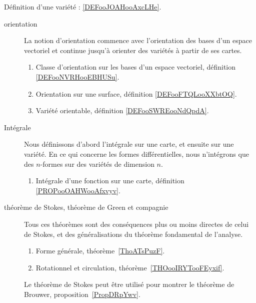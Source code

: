	\label{THEMEooIntegrationVarietes}
Définition d'une variété : \ref{DEFooJOAHooAxcLHe}.
\begin{description}
	\item[orientation]
		La notion d'orientation commence avec l'orientation des bases d'un espace vectoriel et continue jusqu'à orienter des variétés à partir de ses cartes.
		\begin{enumerate}
			\item
			      Classe d'orientation sur les bases d'un espace vectoriel, définition \ref{DEFooNVRHooEBHUSu}.
			\item
			      Orientation sur une surface, définition \ref{DEFooFTQLooXXbtOQ}.
			\item
			      Variété orientable, définition \ref{DEFooSWREooNdQpdA}.
		\end{enumerate}
	\item[Intégrale]
		Nous définissons d'abord l'intégrale sur une carte, et ensuite sur une variété. En ce qui concerne les formes différentielles, nous n'intégrons que des \( n\)-formes sur des variétés de dimension \( n\).
		\begin{enumerate}
			\item
			      Intégrale d'une fonction sur une carte, définition \ref{PROPooOAHWooAfxvyv}.
		\end{enumerate}
	\item[théorème de Stokes, théorème de Green et compagnie]
		Tous ces théorèmes sont des conséquences plus ou moins directes de celui de Stokes, et des généralisations du théorème fondamental de l'analyse.
		\begin{enumerate}
			\item
			      Forme générale, théorème~\ref{ThoATsPuzF}.
			\item
			      Rotationnel et circulation, théorème~\ref{THOooIRYTooFEyxif}.
		\end{enumerate}
		Le théorème de Stokes peut être utilisé pour montrer le théorème de Brouwer, proposition~\ref{PropDRpYwv}.
\end{description}
